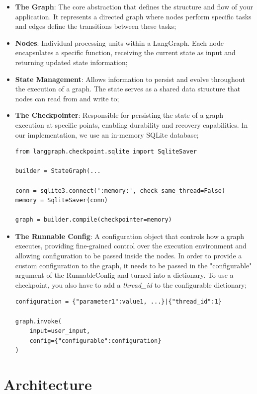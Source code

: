 \documentclass[11pt,a4paper]{report}
\begin{document}
\begin{itemize}
    \item \textbf{The Graph}: The core abstraction that defines the structure and flow of your application. It represents a directed graph where nodes perform specific tasks and edges define the transitions between these tasks;
    \item \textbf{Nodes}: Individual processing units within a LangGraph. Each node encapsulates a specific function, receiving the current state as input and returning updated state information;
    \item \textbf{State Management}: Allows information to persist and evolve throughout the execution of a graph. The state serves as a shared data structure that nodes can read from and write to;
    \item \textbf{The Checkpointer}: Responsible for persisting the state of a graph execution at specific points, enabling durability and recovery capabilities. In our implementation, we use an in-memory SQLite database;
    \begin{lstlisting}[caption={Checkpointer usage}]
from langgraph.checkpoint.sqlite import SqliteSaver

builder = StateGraph(...

conn = sqlite3.connect(':memory:', check_same_thread=False)
memory = SqliteSaver(conn)

graph = builder.compile(checkpointer=memory)
    \end{lstlisting}
    \item \textbf{The Runnable Config}: A configuration object that controls how a graph executes, providing fine-grained control over the execution environment and allowing configuration to be passed inside the nodes. In order to provide a custom configuration to the graph, it needs to be passed in the "configurable" argument of the RunnableConfig and turned into a dictionary. To use a checkpoint, you also have to add a \textit{thread\_id} to the configurable dictionary;
    \begin{lstlisting}[caption={Runnable config usage}]
configuration = {"parameter1":value1, ...}|{"thread_id":1}

graph.invoke(
    input=user_input,
    config={"configurable":configuration}
)
    \end{lstlisting}
\end{itemize}

\chapter{Architecture}
\end{document}
